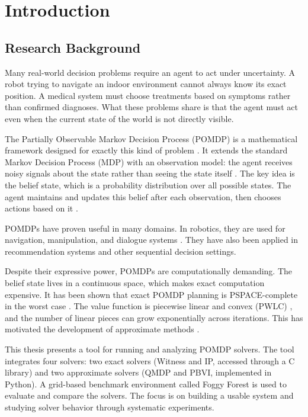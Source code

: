 \chapter{Introduction}
\label{chap:introduction}

\section{Research Background}

Many real-world decision problems require an agent to act under uncertainty.
A robot trying to navigate an indoor environment cannot always know its exact position.
A medical system must choose treatments based on symptoms rather than confirmed diagnoses.
What these problems share is that the agent must act even when the current state of the world is not directly visible.

The Partially Observable Markov Decision Process (POMDP) is a mathematical framework designed for exactly this kind of problem \cite{astrom1965optimal,kaelblingPlanningActingPartially1998}.
It extends the standard Markov Decision Process (MDP) with an observation model: the agent receives noisy signals about the state rather than seeing the state itself \cite{algorithmsSequentialDecisionMaking}.
The key idea is the belief state, which is a probability distribution over all possible states.
The agent maintains and updates this belief after each observation, then chooses actions based on it \cite{pomdpIntroNotes}.

POMDPs have proven useful in many domains.
In robotics, they are used for navigation, manipulation, and dialogue systems \cite{kurniawatiPartiallyObservableMarkov2022,lauriPartiallyObservableMarkov2023,pajarinenPOMDPPlanningObject2023}.
They have also been applied in recommendation systems \cite{mdpBasedRecommenderSystem} and other sequential decision settings.

Despite their expressive power, POMDPs are computationally demanding.
The belief state lives in a continuous space, which makes exact computation expensive.
It has been shown that exact POMDP planning is PSPACE-complete in the worst case \cite{cassandra1994acting}.
The value function is piecewise linear and convex (PWLC) \cite{smallwood1973optimal}, and the number of linear pieces can grow exponentially across iterations.
This has motivated the development of approximate methods \cite{shaniSurveyPointbasedPOMDP2013}.

This thesis presents a tool for running and analyzing POMDP solvers.
The tool integrates four solvers: two exact solvers (Witness and IP, accessed through a C library) and two approximate solvers (QMDP and PBVI, implemented in Python).
A grid-based benchmark environment called Foggy Forest is used to evaluate and compare the solvers.
The focus is on building a usable system and studying solver behavior through systematic experiments.


